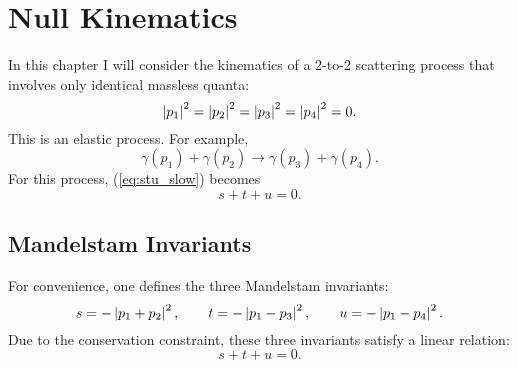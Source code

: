 \chapter{Null Kinematics}
In this chapter I will consider the kinematics of a 2-to-2 scattering process that involves only identical massless quanta:
\begin{equation}
	\left\lvert p_{1} \right\rvert^{2} = \left\lvert p_{2} \right\rvert^{2} = \left\lvert p_{3} \right\rvert^{2} = \left\lvert p_{4} \right\rvert^{2} = 0.
\end{equation}
This is an elastic process. For example,
\begin{equation}
	\gamma(p_{1}) + \gamma(p_{2}) \longrightarrow \gamma(p_{3}) + \gamma(p_{4}).
\end{equation}
For this process, (\ref{eq:stu_slow}) becomes
\begin{equation}
	s + t + u = 0.
\end{equation}
\section{Mandelstam Invariants}
For convenience, one defines the three Mandelstam invariants:
\begin{equation}
	s = -\left\lvert p_{1} + p_{2} \right\rvert^{2}, \qquad t = -\left\lvert p_{1} - p_{3} \right\rvert^{2}, \qquad u = -\left\lvert p_{1} - p_{4} \right\rvert^{2}. 
\end{equation}
Due to the conservation constraint, these three invariants satisfy a linear relation:
\begin{equation}
	s + t + u = 0.
\end{equation}
